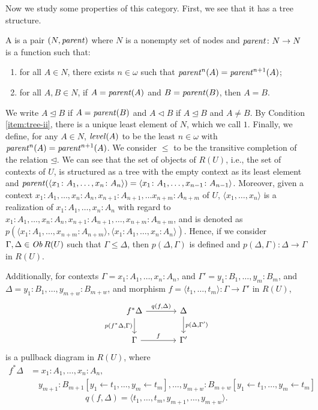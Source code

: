 Now we study some properties of this category.
First, we see that it has a tree structure.
\begin{definition}
    A  is a pair $(N, \operatorname{\mathit{parent}})$ where 
    $N$ is a nonempty set of nodes and 
    $\operatorname{\mathit{parent}}\colon N \to N$ is a function such that:
    \begin{enumerate}
        \item for all $A \in N$, there exists $n \in \omega$
              such that $\operatorname{\mathit{parent}}^n(A) = \operatorname{\mathit{parent}}^{n+1}(A)$;
        \item \label{item:tree-ii}
              for all $A, B \in N$, if $A = \operatorname{\mathit{parent}}(A)$ and
              $B = \operatorname{\mathit{parent}}(B)$, then $A = B$.
    \end{enumerate}
\end{definition}
We write $A \unlhd B$ if $A = \operatorname{\mathit{parent}}(B)$
and $A \lhd B$ if $A \unlhd B$ and $A \neq B$.
By Condition \ref{item:tree-ii}, there is a unique
least element of $N$, which we call $1$.
Finally, we define, for any $A \in N$,
$\operatorname{\mathit{level}}(A)$ to be the least $n \in \omega$ with 
$\operatorname{\mathit{parent}}^n(A) = \operatorname{\mathit{parent}}^{n+1}(A)$.
We consider $\leq$ to be the transitive completion of the relation $\unlhd$.
We can see that the set of objects of $R(U)$, i.e., the set of contexts of $U$, is structured as a tree
with the empty context as its least element and 
\(
    \operatorname{\mathit{parent}} (\langle x_1 \colon A_1, \dots, x_n \colon A_n\rangle)
    = 
    \langle x_1 \colon A_1, \dots, x_{n-1} \colon A_{n-1} \rangle
\).
Moreover, given a context $x_1 \colon A_1, \dots, x_n \colon A_n, x_{n+1} \colon A_{n+1}, \dots x_{n+m} \colon A_{n+m}$
of $U$, $\langle x_1, \dots, x_n \rangle$ is a realization of $x_1 \colon A_1, \dots, x_n \colon A_n$
with regard to $x_1 \colon A_1, \dots, x_n \colon A_n, x_{n+1} \colon A_{n+1}, \dots, x_{n+m} \colon A_{n+m}$, and is denoted
as $p(\langle x_1 \colon A_1, \dots, x_{n+m} \colon A_{n+m} \rangle, \langle x_1 \colon A_1, \dots, x_n \colon A_n \rangle)$.
Hence, if we consider $\Gamma, \Delta \in \operatorname{\mathit{Ob}} R(U)$ such that $\Gamma \leq \Delta$, then $p(\Delta, \Gamma)$ is defined and 
$p(\Delta, \Gamma) \colon \Delta \to \Gamma$ in $R(U)$.

Additionally, for contexts $\Gamma = x_1 \colon A_1, \dots, x_n \colon A_n$, and $\Gamma' = y_1 \colon B_1, \dots, y_m \colon B_m$,
and $\Delta = y_1 \colon B_1, \dots, y_{m+w} \colon B_{m+w}$, and morphism
$f = \langle t_1, \dots, t_m \rangle \colon \Gamma \to \Gamma'$ in $R(U)$, 
\[
\begin{tikzcd}[column sep=large]
    f^*\Delta \arrow[r, "{q(f, \Delta)}"] \arrow[d, "{p(f^*\Delta, \Gamma)}"'] & \Delta \arrow[d, "{p(\Delta, \Gamma')}"] \\
    \Gamma \arrow[r, "f"] & \Gamma'
\end{tikzcd}
\]
is a pullback diagram in $R(U)$, where
\begin{align*}
    f^*\Delta &= x_1 \colon A_1, \dots, x_n \colon A_n, \\
    &\quad y_{m+1} \colon B_{m+1}[y_1 \leftarrow t_1, \dots, y_m \leftarrow t_m], \dots, y_{m+w} \colon B_{m+w}[y_1 \leftarrow t_1, \dots, y_m \leftarrow t_m]
\end{align*}
\[
    q(f, \Delta) = \langle t_1, \dots, t_m, y_{m+1}, \dots, y_{m+w} \rangle.
\]

